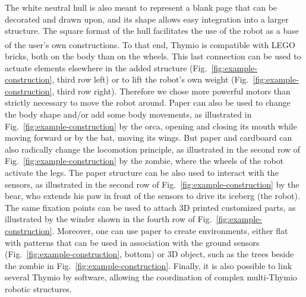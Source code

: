 \documentclass[letterpaper, 10 pt, conference]{ieeeconf}  %
\begin{document}
The white neutral hull is also meant to represent a blank page that can be decorated and drawn upon, and its shape allows easy integration into a larger structure.
The square format of the hull facilitates the use of the robot as a base of the user's own constructions.
To that end, Thymio is compatible with LEGO\textsuperscript{\textregistered} bricks, both on the body than on the wheels. 
This last connection can be used to actuate elements elsewhere in the added structure (Fig.~\ref{fig:example-construction}, third row left) or to lift the robot's own weight (Fig.~\ref{fig:example-construction}, third row right).
Therefore we chose more powerful motors than strictly necessary to move the robot around.
Paper can also be used to change the body shape and/or add some body movements, as illustrated in Fig.~\ref{fig:example-construction} by the orca, opening and closing its mouth while moving forward or by the bat, moving its wings. 
But paper and cardboard can also radically change the locomotion principle, as illustrated in the second row of Fig.~\ref{fig:example-construction} by the zombie, where the wheels of the robot activate the legs. 
The paper structure can be also used to interact with the sensors, as illustrated in the second row of Fig.~\ref{fig:example-construction} by the bear, who extends his paw in front of the sensors to drive its iceberg (the robot).
The same fixation points can be used to attach 3D printed customized parts, as illustrated by the winder shown in the fourth row of Fig.~\ref{fig:example-construction}.
Moreover, one can use paper to create environments, either flat with patterns that can be used in association with the ground sensors (Fig.~\ref{fig:example-construction}, bottom) or 3D object, such as the trees beside the zombie in Fig.~\ref{fig:example-construction}.
Finally, it is also possible to link several Thymio by software, allowing the coordination of complex multi-Thymio robotic structures.
\end{document}
